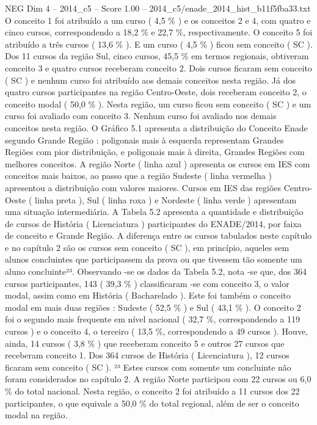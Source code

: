 \begin{textsample}{NEG Dim 4 – 2014\_c5 – Score 1.00 – 2014\_c5/enade\_2014\_hist\_b11f5fba33.txt}
O conceito 1 foi atribuído a um curso ( 4,5 \% ) e os conceitos 2 e 4, com quatro e cinco cursos, correspondendo a 18,2 \% e 22,7 \%, respectivamente.
O conceito 5 foi atribuído a três cursos ( 13,6 \% ).
E um curso ( 4,5 \% ) ficou sem conceito ( SC ).
Dos 11 cursos da região Sul, cinco cursos, 45,5 \% em termos regionais, obtiveram conceito 3 e quatro cursos receberam conceito 2.
Dois cursos ficaram sem conceito ( SC ) e nenhum curso foi atribuído aos demais conceitos nesta região.
Já dos quatro cursos participantes na região Centro-Oeste, dois receberam conceito 2, o conceito modal ( 50,0 \% ).
Nesta região, um curso ficou sem conceito ( SC ) e um curso foi avaliado com conceito 3.
Nenhum curso foi avaliado nos demais conceitos nesta região.
O Gráfico 5.1 apresenta a distribuição do Conceito Enade segundo Grande Região : poligonais mais à esquerda representam Grandes Regiões com pior distribuição, e poligonais mais à direita, Grandes Regiões com melhores conceitos.
A região Norte ( linha azul ) apresenta os cursos em IES com conceitos mais baixos, ao passo que a região Sudeste ( linha vermelha ) apresentou a distribuição com valores maiores.
Cursos em IES das regiões Centro-Oeste ( linha preta ), Sul ( linha roxa ) e Nordeste ( linha verde ) apresentam uma situação intermediária.
A Tabela 5.2 apresenta a quantidade e distribuição de cursos de História ( Licenciatura ) participantes do ENADE/2014, por faixa de conceito e Grande Região.
A diferença entre os cursos tabulados neste capítulo e no capítulo 2 são os cursos sem conceito ( SC ), em princípio, aqueles sem alunos concluintes que participassem da prova ou que tivessem tão somente um aluno concluinte²³.
Observando -se os dados da Tabela 5.2, nota -se que, dos 364 cursos participantes, 143 ( 39,3 \% ) classificaram -se com conceito 3, o valor modal, assim como em História ( Bacharelado ).
Este foi também o conceito modal em mais duas regiões : Sudeste ( 52,5 \% ) e Sul ( 43,1 \% ).
O conceito 2 foi o segundo mais frequente em nível nacional ( 32,7 \%, correspondendo a 119 cursos ) e o conceito 4, o terceiro ( 13,5 \%, correspondendo a 49 cursos ).
Houve, ainda, 14 cursos ( 3,8 \% ) que receberam conceito 5 e outros 27 cursos que receberam conceito 1.
Dos 364 cursos de História ( Licenciatura ), 12 cursos ficaram sem conceito ( SC ). ²³ Estes cursos com somente um concluinte não foram considerados no capítulo 2.
A região Norte participou com 22 cursos ou 6,0 \% do total nacional.
Nesta região, o conceito 2 foi atribuído a 11 cursos dos 22 participantes, o que equivale a 50,0 \% do total regional, além de ser o conceito modal na região.

\end{textsample}
